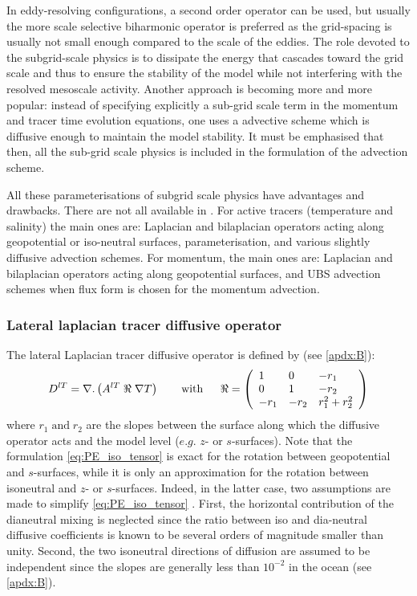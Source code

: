 \documentclass[../main/NEMO_manual]{subfiles}
\begin{document}
In eddy-resolving configurations, a second order operator can be used,
but usually the more scale selective biharmonic operator is preferred as
the grid-spacing is usually not small enough compared to the scale of the eddies.
The role devoted to the subgrid-scale physics is to dissipate the energy that
cascades toward the grid scale and thus to ensure the stability of the model while
not interfering with the resolved mesoscale activity.
Another approach is becoming more and more popular:
instead of specifying explicitly a sub-grid scale term in the momentum and tracer time evolution equations,
one uses a advective scheme which is diffusive enough to maintain the model stability.
It must be emphasised that then, all the sub-grid scale physics is included in the formulation of
the advection scheme. 

All these parameterisations of subgrid scale physics have advantages and drawbacks.
There are not all available in \NEMO. For active tracers (temperature and salinity) the main ones are:
Laplacian and bilaplacian operators acting along geopotential or iso-neutral surfaces,
\citet{Gent1990} parameterisation, and various slightly diffusive advection schemes.
For momentum, the main ones are: Laplacian and bilaplacian operators acting along geopotential surfaces,
and UBS advection schemes when flux form is chosen for the momentum advection.

\subsubsection{Lateral laplacian tracer diffusive operator}

The lateral Laplacian tracer diffusive operator is defined by (see \autoref{apdx:B}):
\begin{equation}
  \label{eq:PE_iso_tensor}
  D^{lT}=\nabla {\rm {\bf .}}\left( {A^{lT}\;\Re \;\nabla T} \right) \qquad
  \mbox{with}\quad \;\;\Re =\left( {{
        \begin{array}{*{20}c}
          1 \hfill & 0 \hfill & {-r_1 } \hfill \\
          0 \hfill & 1 \hfill & {-r_2 } \hfill \\
          {-r_1 } \hfill & {-r_2 } \hfill & {r_1 ^2+r_2 ^2} \hfill \\
        \end{array}
      }} \right)
\end{equation}
where $r_1 \;\mbox{and}\;r_2 $ are the slopes between the surface along which the diffusive operator acts and
the model level ($e. g.$ $z$- or $s$-surfaces).
Note that the formulation \autoref{eq:PE_iso_tensor} is exact for
the rotation between geopotential and $s$-surfaces,
while it is only an approximation for the rotation between isoneutral and $z$- or $s$-surfaces.
Indeed, in the latter case, two assumptions are made to simplify \autoref{eq:PE_iso_tensor} \citep{Cox1987}.
First, the horizontal contribution of the dianeutral mixing is neglected since the ratio between iso and
dia-neutral diffusive coefficients is known to be several orders of magnitude smaller than unity.
Second, the two isoneutral directions of diffusion are assumed to be independent since
the slopes are generally less than $10^{-2}$ in the ocean (see \autoref{apdx:B}).
\end{document}
